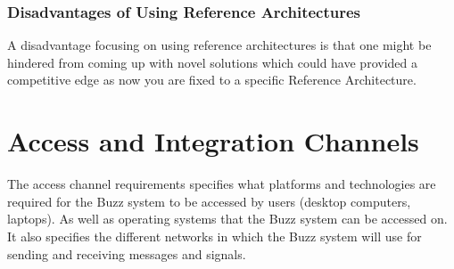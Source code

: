 \documentclass[a4paper]{article}
\begin{document}
\subsubsection{Disadvantages of Using Reference Architectures}
A disadvantage focusing on using reference architectures is that one might be hindered from coming up with novel solutions which could have provided a competitive edge as now you are fixed to a specific Reference Architecture.


\section{Access and Integration Channels}
The access channel requirements specifies what platforms and technologies are required for the Buzz system to be accessed by users (desktop computers, laptops). As well as operating systems that the Buzz system can be accessed on. It also specifies the different networks in which the Buzz system will use for sending and receiving messages and signals.
\end{document}
